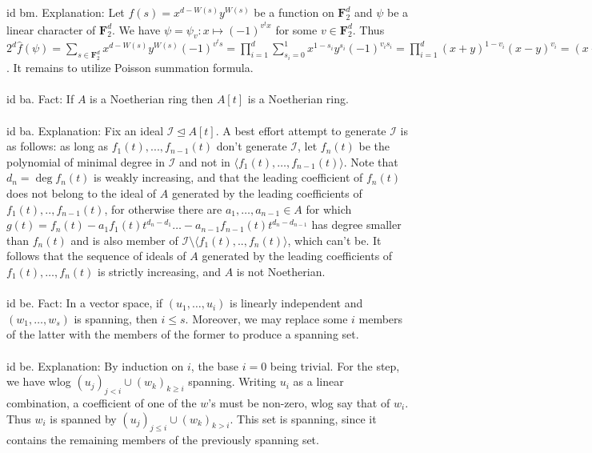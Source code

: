 \documentclass[oneside]{book}
\newcommand{\F}{\mathbf{F}}
\newcommand{\II}{\mathscr{I}}
\newcommand{\ideal}{\trianglelefteq}
\newcommand{\gen}[1]{\langle #1\rangle}
\begin{document}
id bm. Explanation: Let $f(s)=x^{d-W(s)}y^{W(s)}$ be a function on $\F_2^d$ and $\psi$ be a linear character of $\F_2^d$. We have $\psi=\psi_v:x\mapsto (-1)^{v^tx}$ for some $v\in \F_2^d$. Thus $2^d\hat{f}(\psi)=\sum_{s\in\F_2^d} x^{d-W(s)}y^{W(s)}(-1)^{v^ts}=\prod_{i=1}^d\sum_{s_i=0}^1  x^{1-s_i}y^{s_i}(-1)^{v_is_i}=\prod_{i=1}^d (x+y)^{1-v_i}(x-y)^{v_i}=(x+y)^{d-W(v)}(x-y)^{W(v)}$. It remains to utilize Poisson summation formula. \\\\


id ba. Fact: If $A$ is a Noetherian ring then $A[t]$ is a Noetherian ring.  \\\\


id ba. Explanation: Fix an ideal $\II\ideal A[t]$. A best effort attempt to generate $\II$ is as follows: as long as $f_1(t),...,f_{n-1}(t)$ don't generate $\II$, let $f_n(t)$ be the polynomial of minimal degree in $\II$ and not in $\gen{f_1(t),\dots,f_{n-1}(t)}$. Note that $d_n=\deg f_n(t)$ is weakly increasing, and that the leading coefficient of $f_n(t)$ does not belong to the ideal of $A$ generated by the leading coefficients of  $f_1(t),..,f_{n-1}(t)$, for otherwise there are $a_1,\dots,a_{n-1}\in A$ for which $g(t)=f_n(t)-a_1f_1(t)t^{d_n-d_1}\dots-a_{n-1}f_{n-1}(t)t^{d_n-d_{n-1}}$ has degree smaller than $f_n(t)$ and is also member of $\II\setminus \gen{f_1(t),..,f_n(t)}$, which can't be. It follows that the sequence of ideals of $A$ generated by the leading coefficients of $f_1(t),\dots,f_n(t)$ is strictly increasing, and $A$ is not Noetherian. \\\\


id be. Fact: In a vector space, if $(u_1,\dots,u_i)$ is linearly independent and $(w_1,\dots,w_s)$ is spanning, then $i\le s$. Moreover, we may replace some $i$ members of the latter with the members of the former to produce a spanning set.  \\\\


id be. Explanation: By induction on $i$, the base $i=0$ being trivial. For the step, we have wlog $(u_j)_{j<i}\cup (w_k)_{k\ge i}$ spanning. Writing $u_i$ as a linear combination, a coefficient of one of the $w$'s must be non-zero, wlog say that of $w_i$. Thus $w_i$ is spanned by $(u_j)_{j\le i}\cup (w_k)_{k>i}$. This set is spanning, since it contains the remaining members of the previously spanning set.   \\\\
\end{document}
